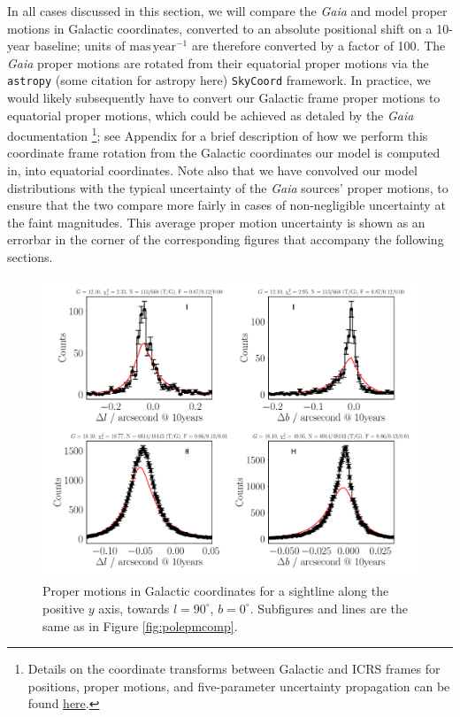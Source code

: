 \documentclass[fleqn,usenatbib]{mnras}
\begin{document}
In all cases discussed in this section, we will compare the \textit{Gaia} and model proper motions in Galactic coordinates, converted to an absolute positional shift on a 10-year baseline; units of $\mathrm{mas}\,\mathrm{year}^{-1}$ are therefore converted by a factor of 100.
The \textit{Gaia} proper motions are rotated from their equatorial proper motions via the \texttt{astropy} (some citation for astropy here) \texttt{SkyCoord} framework.
In practice, we would likely subsequently have to convert our Galactic frame proper motions to equatorial proper motions, which could be achieved as detaled by the \textit{Gaia} documentation
\footnote{Details on the coordinate transforms between Galactic and ICRS frames for positions, proper motions, and five-parameter uncertainty propagation can be found \href{https://gea.esac.esa.int/archive/documentation/GDR2/Data_processing/chap_cu3ast/sec_cu3ast_intro/ssec_cu3ast_intro_tansforms.html}{here}.};
see Appendix for a brief description of how we perform this coordinate frame rotation from the Galactic coordinates our model is computed in, into equatorial coordinates.
Note also that we have convolved our model distributions with the typical uncertainty of the \textit{Gaia} sources' proper motions, to ensure that the two compare more fairly in cases of non-negligible uncertainty at the faint magnitudes.
This average proper motion uncertainty is shown as an errorbar in the corner of the corresponding figures that accompany the following sections.

\begin{figure}
    \centering
    \includegraphics[width=\columnwidth]{Plots/plots_pm_gaia_90_0.pdf}
    \caption{Proper motions in Galactic coordinates for a sightline along the positive $y$ axis, towards $l = 90^\circ$, $b = 0^\circ$.
    Subfigures and lines are the same as in Figure \ref{fig:polepmcomp}.}
    \label{fig:l90comp}
\end{figure}
\end{document}
